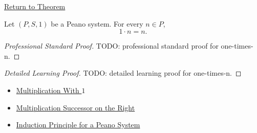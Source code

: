 \newpage
{}
\label{prf:one-times-n}

\begin{remark*}[Return]
\hyperref[thm:one-times-n]{Return to Theorem}
\end{remark*}

\begin{theorem*}
Let $(P,S,1)$ be a Peano system. For every $n \in P$,
\[
1 \cdot n = n.
\]
\end{theorem*}

\begin{proof}[Professional Standard Proof]
\LRAProofBodyStart
TODO: professional standard proof for one-times-n.
\end{proof}

\begin{proof}[Detailed Learning Proof]
\LRAProofBodyStart
TODO: detailed learning proof for one-times-n.
\end{proof}

\begin{remark*}
\end{remark*}

\begin{dependencies}
\begin{itemize}
  \item \hyperref[thm:multiplication-with-one]{Multiplication With $1$}
  \item \hyperref[thm:multiplication-successor-on-right]{Multiplication Successor on the Right}
  \item \hyperref[thm:induction-principle-for-peano-system]{Induction Principle for a Peano System}
\end{itemize}
\end{dependencies}

\clearpage
